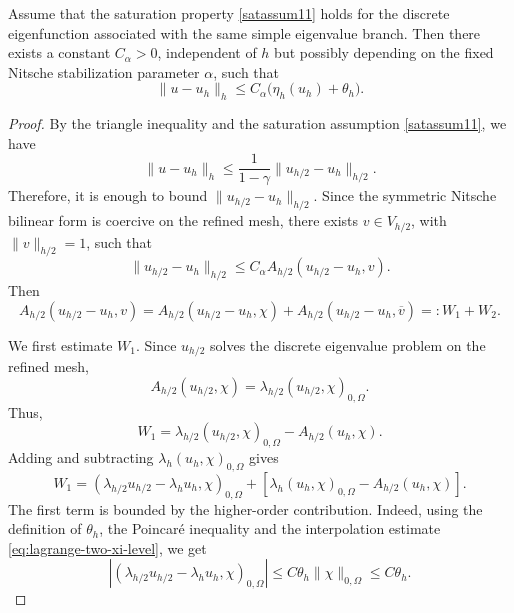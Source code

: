 \documentclass[onefignum,onetabnum,final]{siamart250211}
\numberwithin{equation}{section}
\newcommand\0{\boldsymbol{0}}
\begin{document}
\begin{theorem}[Reliability]
Assume that the saturation property \eqref{satassum11} holds for the discrete
eigenfunction associated with the same simple eigenvalue branch. Then there exists a
constant $C_\alpha>0$, independent of $h$ but possibly depending on the fixed Nitsche
stabilization parameter $\alpha$, such that
\[
   \|u-u_h\|_h \leq C_\alpha\big(\eta_h(u_h)+\theta_h\big).
\]
\end{theorem}

\begin{proof}
By the triangle inequality and the saturation assumption \eqref{satassum11}, we have
\[
   \|u-u_h\|_h \leq \frac{1}{1-\gamma}\|u_{h/2}-u_h\|_{h/2}.
\]
Therefore, it is enough to bound $\|u_{h/2}-u_h\|_{h/2}$. Since the symmetric Nitsche
bilinear form is coercive on the refined mesh, there exists $v\in V_{h/2}$, with
$\|v\|_{h/2}=1$, such that
\[
   \|u_{h/2}-u_h\|_{h/2} \leq C_\alpha A_{h/2}(u_{h/2}-u_h,v).
\]
Then
\begin{equation}\label{releq11}
A_{h/2}(u_{h/2}-u_h,v) =A_{h/2}(u_{h/2}-u_h,\chi) + A_{h/2}(u_{h/2}-u_h,\overline{v})=: W_1+W_2.
\end{equation}

We first estimate $W_1$. Since $u_{h/2}$ solves the discrete eigenvalue problem on
the refined mesh,
\[
   A_{h/2}(u_{h/2},\chi) = \lambda_{h/2}(u_{h/2},\chi)_{0,\Omega}.
\]
Thus,
\[
   W_1 = \lambda_{h/2}(u_{h/2},\chi)_{0,\Omega} - A_{h/2}(u_h,\chi).
\]
Adding and subtracting $\lambda_h(u_h,\chi)_{0,\Omega}$ gives
\[
   W_1 = (\lambda_{h/2}u_{h/2}-\lambda_hu_h,\chi)_{0,\Omega} + \left[\lambda_h(u_h,\chi)_{0,\Omega} -  A_{h/2}(u_h,\chi) \right].
\]
The first term is bounded by the higher-order contribution. Indeed, using the
definition of $\theta_h$, the Poincar\'e inequality and the interpolation estimate
\eqref{eq:lagrange-two-xi-level}, we get
\[
   |(\lambda_{h/2}u_{h/2}-\lambda_hu_h,\chi)_{0,\Omega}| \leq C\theta_h\|\chi\|_{0,\Omega} \leq  C\theta_h.
\]


\end{proof}
\end{document}
